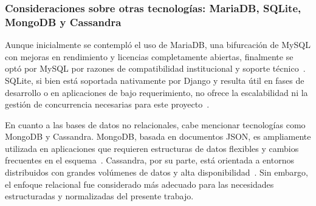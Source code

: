 \subsubsection{Consideraciones sobre otras tecnologías: MariaDB, SQLite, MongoDB y Cassandra}

Aunque inicialmente se contempló el uso de MariaDB, una bifurcación de MySQL con mejoras en rendimiento y licencias completamente abiertas, finalmente se optó por MySQL por razones de compatibilidad institucional y soporte técnico~\cite{mariadb2023}. SQLite, si bien está soportada nativamente por Django y resulta útil en fases de desarrollo o en aplicaciones de bajo requerimiento, no ofrece la escalabilidad ni la gestión de concurrencia necesarias para este proyecto~\cite{django_sqlite2024}. 

En cuanto a las bases de datos no relacionales, cabe mencionar tecnologías como MongoDB y Cassandra. MongoDB, basada en documentos JSON, es ampliamente utilizada en aplicaciones que requieren estructuras de datos flexibles y cambios frecuentes en el esquema~\cite{mongodb2024}. Cassandra, por su parte, está orientada a entornos distribuidos con grandes volúmenes de datos y alta disponibilidad~\cite{cassandra2023}. Sin embargo, el enfoque relacional fue considerado más adecuado para las necesidades estructuradas y normalizadas del presente trabajo.

\vspace{1em}